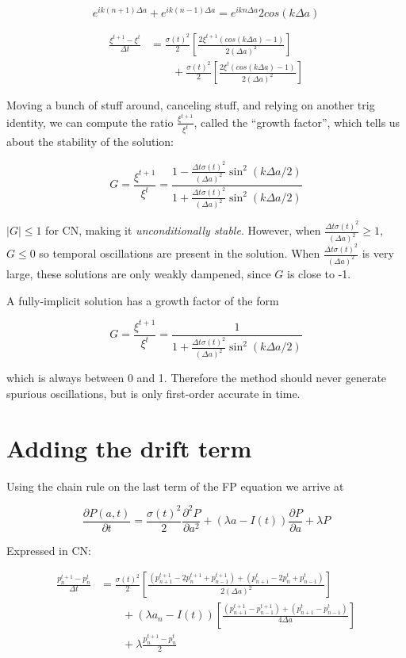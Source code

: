 \documentclass[12pt]{article}
\newcommand{\be}{\begin{equation}}
\newcommand{\ee}{\end{equation}}
\begin{document}
\be
	e^{ik(n+1)\Delta a} + e^{ik(n-1)\Delta a} = e^{ikn\Delta a}2cos(k\Delta a)
\ee

\begin{align} 
\frac{\xi^{t+1} - \xi^t}{\Delta t} &= \frac{\sigma(t)^2}{2} \left[ \frac{2\xi^{t+1} \left( cos(k\Delta a) - 1\right)}{2{\left(\Delta a\right)}^2} \right] \nonumber \\ 
	&\qquad {} + \frac{\sigma(t)^2}{2} \left[ \frac{2\xi^{t} \left( cos(k\Delta a) - 1\right)}{2{\left(\Delta a\right)}^2} \right]
\end{align}

Moving a bunch of stuff around, canceling stuff, and relying on another trig identity, we can compute the ratio $\frac{\xi^{t+1}}{\xi^{t}}$, called the ``growth factor'', which tells us about the stability of the solution:

\be
G = \frac{\xi^{t+1}}{\xi^{t}} = \frac{1 - \frac{\Delta t \sigma(t)^2}{{(\Delta a)}^2}\sin^2(k\Delta a/2)}{1 + \frac{\Delta t \sigma(t)^2}{{(\Delta a)}^2}\sin^2(k\Delta a/2)}
\ee

$|G| \leq 1$ for CN, making it \emph{unconditionally stable}. However, when $\frac{\Delta t \sigma(t)^2}{{(\Delta a)}^2} \geq 1$, $G \leq 0$ so temporal oscillations are present in the solution. When $\frac{\Delta t \sigma(t)^2}{{(\Delta a)}^2} $ is very large, these solutions are only weakly dampened, since $G$ is close to -1.

A fully-implicit solution has a growth factor of the form

\be
G = \frac{\xi^{t+1}}{\xi^{t}} = \frac{1}{1 + \frac{\Delta t \sigma(t)^2}{{(\Delta a)}^2}\sin^2(k\Delta a/2)}
\ee

which is always between 0 and 1. Therefore the method should never generate spurious oscillations, but is only first-order accurate in time. 

\section{Adding the drift term}

Using the chain rule on the last term of the FP equation we arrive at

\be
\frac{\partial P(a,t)}{\partial t} = \frac{\sigma(t)^2}{2} \frac{\partial^2 P}{\partial a^2} + (\lambda a -I(t)) \frac{\partial P}{\partial a} + \lambda P
\ee

Expressed in CN:

\begin{align} \label{eq:CN}
	\frac{p^{t+1}_n - p^{t}_n}{\Delta t} &= \frac{\sigma(t)^2}{2} \left[ \frac{\left(p^{t+1}_{n+1} - 2p^{t+1}_n + p^{t+1}_{n-1}\right) + \left(p^{t}_{n+1} - 2p^{t}_n + p^{t}_{n-1}\right)}{2{\left(\Delta a\right)}^2} \right]  \nonumber \\
	&\qquad {} + \left(\lambda a_n - I(t) \right) \left[ \frac{\left(p^{t+1}_{n+1} - p^{t+1}_{n-1}\right) + \left(p^{t}_{n+1} - p^{t}_{n-1}\right)}{4 \Delta a}\right]  \nonumber \\
	&\qquad {} + \lambda\frac{p^{t+1}_n - p^{t}_n}{2}	
\end{align}
\end{document}
